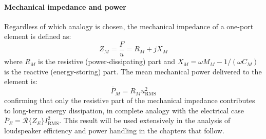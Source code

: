 \paragraph{Mechanical impedance and power} Regardless of which analogy is chosen, the mechanical impedance of a one-port element is defined as:
\[
Z_M = \frac{F}{u} = R_M + j X_M
\]
where \(R_M\) is the resistive (power-dissipating) part and \(X_M = \omega M_M - 1/(\omega C_M)\) is the reactive (energy-storing) part. The mean mechanical power delivered to the element is:
\[
\bar P_M = R_M u_{\mathrm{RMS}}^2
\]
confirming that only the resistive part of the mechanical impedance contributes to long-term energy dissipation, in complete analogy with the electrical case \(\bar P_E = \mathcal{R}\{Z_E\} I_{\mathrm{RMS}}^2\). This result will be used extensively in the analysis of loudspeaker efficiency and power handling in the chapters that follow.